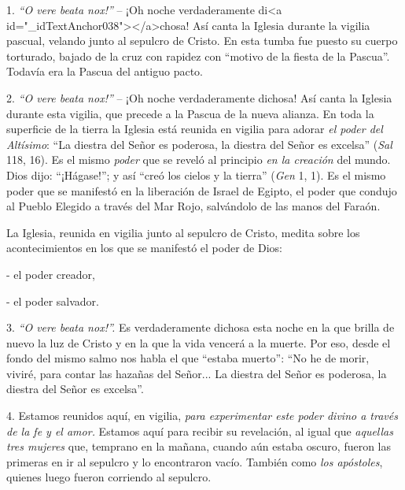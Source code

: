 			\begin{body} 1. \textit{“O vere beata nox!” }– ¡Oh noche verdaderamente di<a id="_idTextAnchor038"></a>chosa! Así canta la Iglesia durante la vigilia pascual, velando junto al sepulcro de Cristo. En esta tumba fue puesto su cuerpo torturado, bajado de la cruz con rapidez con “motivo de la fiesta de la Pascua”. Todavía era la Pascua del antiguo pacto. \end{body}
			
			\begin{body}2. \textit{“O vere beata nox!”} – ¡Oh noche verdaderamente dichosa! Así canta la Iglesia durante esta vigilia, que precede a la Pascua de la nueva alianza. En toda la superficie de la tierra la Iglesia está reunida en vigilia para adorar \textit{el poder del Altísimo}: “La diestra del Señor es poderosa, la diestra del Señor es excelsa” (\textit{Sal} 118, 16). Es el mismo \textit{poder} que se reveló al principio \textit{en la creación} del mundo. Dios dijo: “¡Hágase!”; y así “creó los cielos y la tierra” (\textit{Gen} 1, 1). Es el mismo poder que se manifestó en la liberación de Israel de Egipto, el poder que condujo al Pueblo Elegido a través del Mar Rojo, salvándolo de las manos del Faraón. \end{body}
			
			\begin{body}La Iglesia, reunida en vigilia junto al sepulcro de Cristo, medita sobre los acontecimientos en los que se manifestó el poder de Dios: \end{body}
			
			\begin{body}- el poder creador, \end{body}
			
			\begin{body}- el poder salvador. \end{body}
			
			\begin{body}3. \textit{“O vere beata nox!”. }Es verdaderamente dichosa esta noche en la que brilla de nuevo la luz de Cristo y en la que la vida vencerá a la muerte. Por eso, desde el fondo del mismo salmo nos habla el que “estaba muerto”: “No he de morir, viviré, para contar las hazañas del Señor... La diestra del Señor es poderosa, la diestra del Señor es excelsa”. \end{body}
			
			\begin{body}4. Estamos reunidos aquí, en vigilia, \textit{para experimentar este poder divino a través de la fe y el amor. }Estamos aquí para recibir su revelación, al igual que \textit{aquellas tres mujeres} que, temprano en la mañana, cuando aún estaba oscuro, fueron las primeras en ir al sepulcro y lo encontraron vacío. También como \textit{los apóstoles}, quienes luego fueron corriendo al sepulcro. \end{body}
			
